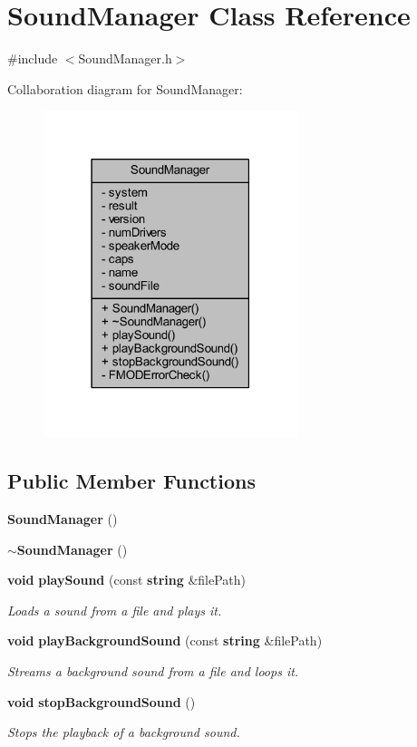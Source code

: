 \section{Sound\+Manager Class Reference}
\label{class_sound_manager}


{\ttfamily \#include $<$Sound\+Manager.\+h$>$}



Collaboration diagram for Sound\+Manager\+:\nopagebreak
\begin{figure}[H]
\begin{center}
\leavevmode
\includegraphics[width=210pt]{d3/da9/class_sound_manager__coll__graph}
\end{center}
\end{figure}
\subsection*{Public Member Functions}
\begin{DoxyCompactItemize}
\item 
{\bf Sound\+Manager} ()
\item 
{\bf $\sim$\+Sound\+Manager} ()
\item 
{\bf void} {\bf play\+Sound} (const {\bf string} \&file\+Path)
\begin{DoxyCompactList}\small\item\em Loads a sound from a file and plays it. \end{DoxyCompactList}\item 
{\bf void} {\bf play\+Background\+Sound} (const {\bf string} \&file\+Path)
\begin{DoxyCompactList}\small\item\em Streams a background sound from a file and loops it. \end{DoxyCompactList}\item 
{\bf void} {\bf stop\+Background\+Sound} ()
\begin{DoxyCompactList}\small\item\em Stops the playback of a background sound. \end{DoxyCompactList}\end{DoxyCompactItemize}
